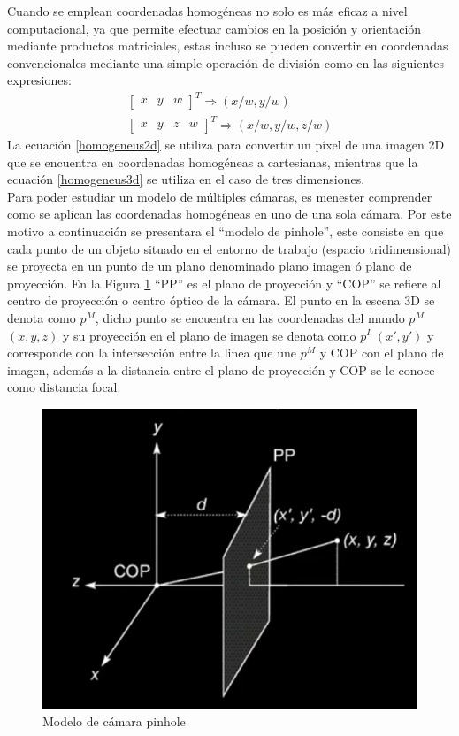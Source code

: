 Cuando se emplean coordenadas homogéneas no solo es más eficaz a nivel computacional, ya que permite efectuar cambios en la posición y orientación mediante productos matriciales, estas incluso se pueden convertir en coordenadas convencionales mediante una simple operación de división como en las siguientes expresiones:
\begin{align}
\begin{bmatrix}
x & y & w
\end{bmatrix}^{T} \Rightarrow (x/w, y/w)\label{homogeneus2d}\\
\begin{bmatrix}
x & y & z & w
\end{bmatrix}^{T} \Rightarrow (x/w, y/w, z/w)\label{homogeneus3d}
\end{align}
La ecuación \ref{homogeneus2d} se utiliza para convertir un píxel de una imagen 2D que se encuentra en coordenadas homogéneas a cartesianas, mientras que la ecuación \ref{homogeneus3d} se utiliza en el caso de tres dimensiones.
\\
Para poder estudiar un modelo de múltiples cámaras, es menester comprender  como se aplican las coordenadas homogéneas en uno de una sola cámara. Por este motivo a continuación se presentara el ``modelo de pinhole'', este consiste en que cada punto de un objeto situado en el entorno de trabajo (espacio tridimensional) se proyecta en un punto de un plano denominado plano imagen ó plano de proyección. En la Figura \ref{pinholeModel} ``PP'' es el plano de proyección y ``COP'' se refiere al centro de proyección o centro óptico de la cámara. El punto en la escena 3D se denota como $p^{M}$, dicho punto se encuentra en las coordenadas del mundo $p^{M}$ $(x, y, z)$ y su proyección en el plano de imagen se denota como $p^{I}$ $(x', y')$ y corresponde con la intersección entre la linea que une $p^{M}$ y COP con el plano de imagen, además a la distancia entre el plano de proyección y COP se le conoce como distancia focal. 
\begin{figure}[H]
    \centering
    \includegraphics[scale=0.5]{Recursos/pinholeModel.jpg}
    \caption{Modelo de cámara pinhole}
    \label{pinholeModel}
\end{figure}
